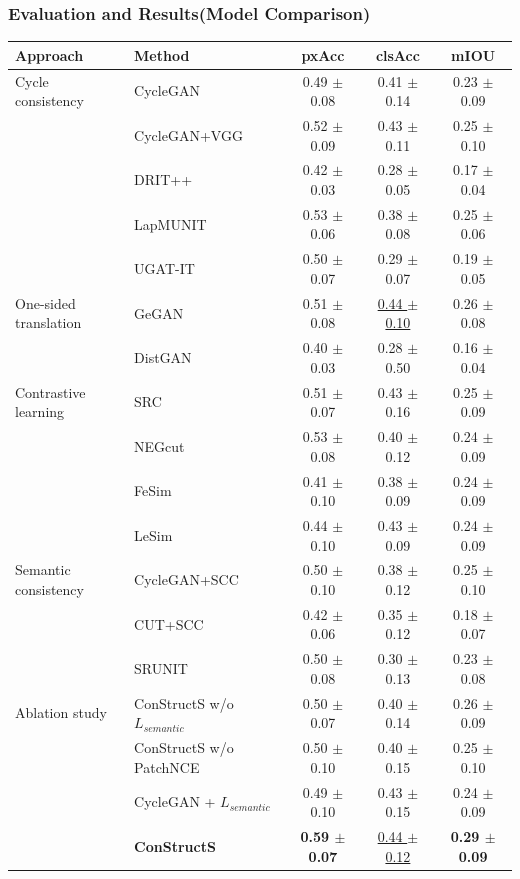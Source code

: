 \documentclass[aspectratio=169, lecture, amberg]{OTHAWbeamer}
\begin{document}
\begin{frame}
    \frametitle{Evaluation and Results(Model Comparison)}
    
    \begin{table}[ht]
     \tiny
    \centering
    \begin{tabular}{l l c c c}
    \toprule
    \textbf{Approach} & \textbf{Method} & \textbf{pxAcc} & \textbf{clsAcc} & \textbf{mIOU} \\
    \midrule
    Cycle consistency & CycleGAN  & 0.49 $\pm$ 0.08 & 0.41 $\pm$ 0.14 & 0.23 $\pm$ 0.09 \\
    & CycleGAN+VGG  & 0.52 $\pm$ 0.09 & 0.43 $\pm$ 0.11 & 0.25 $\pm$ 0.10 \\
    & DRIT++  & 0.42 $\pm$ 0.03 & 0.28 $\pm$ 0.05 & 0.17 $\pm$ 0.04 \\
    & LapMUNIT  & 0.53 $\pm$ 0.06 & 0.38 $\pm$ 0.08 & 0.25 $\pm$ 0.06 \\
    & UGAT-IT  & 0.50 $\pm$ 0.07 & 0.29 $\pm$ 0.07 & 0.19 $\pm$ 0.05 \\
    \midrule
    One-sided translation & GeGAN  & 0.51 $\pm$ 0.08 & \underline{0.44 $\pm$ 0.10} & 0.26 $\pm$ 0.08 \\
    & DistGAN  & 0.40 $\pm$ 0.03 & 0.28 $\pm$ 0.50 & 0.16 $\pm$ 0.04 \\
    \midrule
    Contrastive learning & SRC  & 0.51 $\pm$ 0.07 & 0.43 $\pm$ 0.16 & 0.25 $\pm$ 0.09 \\
    & NEGcut  & 0.53 $\pm$ 0.08 & 0.40 $\pm$ 0.12 & 0.24 $\pm$ 0.09 \\
    & FeSim  & 0.41 $\pm$ 0.10 & 0.38 $\pm$ 0.09 & 0.24 $\pm$ 0.09 \\
    & LeSim  & 0.44 $\pm$ 0.10 & 0.43 $\pm$ 0.09 & 0.24 $\pm$ 0.09 \\
    \midrule
    Semantic consistency & CycleGAN+SCC  & 0.50 $\pm$ 0.10 & 0.38 $\pm$ 0.12 & 0.25 $\pm$ 0.10 \\
    & CUT+SCC  & 0.42 $\pm$ 0.06 & 0.35 $\pm$ 0.12 & 0.18 $\pm$ 0.07 \\
    & SRUNIT  & 0.50 $\pm$ 0.08 & 0.30 $\pm$ 0.13 & 0.23 $\pm$ 0.08 \\
    \midrule
    Ablation study & ConStructS w/o $L_{semantic}$  & 0.50 $\pm$ 0.07 & 0.40 $\pm$ 0.14 & 0.26 $\pm$ 0.09 \\
    & ConStructS w/o PatchNCE  & 0.50 $\pm$ 0.10 & 0.40 $\pm$ 0.15 & 0.25 $\pm$ 0.10 \\
    & CycleGAN + $L_{semantic}$  & 0.49 $\pm$ 0.10 & 0.43 $\pm$ 0.15 & 0.24 $\pm$ 0.09 \\
    & \textbf{ConStructS}  & \textbf{0.59 $\pm$ 0.07} & \underline{0.44 $\pm$ 0.12} & \textbf{0.29 $\pm$ 0.09} \\
    \bottomrule
    \end{tabular}
    \label{tab:model_comparison}
    \end{table}
    
\end{frame}
\end{document}

